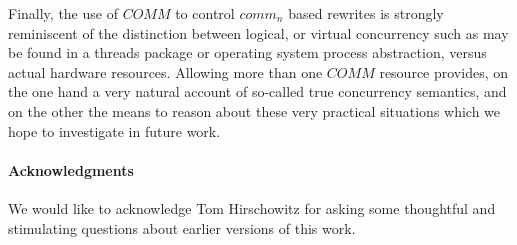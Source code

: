 \documentclass[]{acm_proc_article-sp}
\numberwithin{equation}{subsection}
\begin{document}
Finally, the use of $COMM$ to control $comm_n$ based rewrites is
strongly reminiscent of the distinction between logical, or virtual
concurrency such as may be found in a threads package or operating
system process abstraction, versus actual hardware resources. Allowing
more than one $COMM$ resource provides, on the one hand a very natural
account of so-called true concurrency semantics, and on the other the
means to reason about these very practical situations which we hope to
investigate in future work.

\paragraph{Acknowledgments}
We would like to acknowledge Tom Hirschowitz for asking some thoughtful
and stimulating questions about earlier versions of this work.







\end{document}

